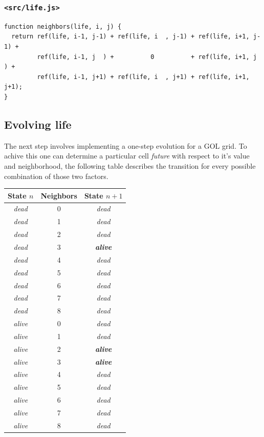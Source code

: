 \documentclass[11pt]{article}
\begin{document}
\subsubsection{\texttt{<src/life.js>}}
\label{sec:org4f488cd}
\begin{verbatim}
function neighbors(life, i, j) {
  return ref(life, i-1, j-1) + ref(life, i  , j-1) + ref(life, i+1, j-1) +
         ref(life, i-1, j  ) +          0          + ref(life, i+1, j  ) +
         ref(life, i-1, j+1) + ref(life, i  , j+1) + ref(life, i+1, j+1);
}
\end{verbatim}

\subsection{Evolving life}
\label{sec:orgf154447}

The next step involves implementing a one-step evolution for a GOL grid. To achive this one can determine a particular cell \emph{future} with respect to it's value and neighborhood, the following table describes the transition for every possible combination of those two factors.

\begin{center}
\label{tab:org830a7ee}
\begin{tabular}{ccc}
State \(n\) & Neighbors & State \(n+1\)\\
\hline
\emph{dead} & 0 & \emph{dead}\\
\emph{dead} & 1 & \emph{dead}\\
\emph{dead} & 2 & \emph{dead}\\
\emph{dead} & 3 & \emph{\textbf{alive}}\\
\emph{dead} & 4 & \emph{dead}\\
\emph{dead} & 5 & \emph{dead}\\
\emph{dead} & 6 & \emph{dead}\\
\emph{dead} & 7 & \emph{dead}\\
\emph{dead} & 8 & \emph{dead}\\
\emph{alive} & 0 & \emph{dead}\\
\emph{alive} & 1 & \emph{dead}\\
\emph{alive} & 2 & \emph{\textbf{alive}}\\
\emph{alive} & 3 & \emph{\textbf{alive}}\\
\emph{alive} & 4 & \emph{dead}\\
\emph{alive} & 5 & \emph{dead}\\
\emph{alive} & 6 & \emph{dead}\\
\emph{alive} & 7 & \emph{dead}\\
\emph{alive} & 8 & \emph{dead}\\
\end{tabular}
\end{center}
\end{document}
